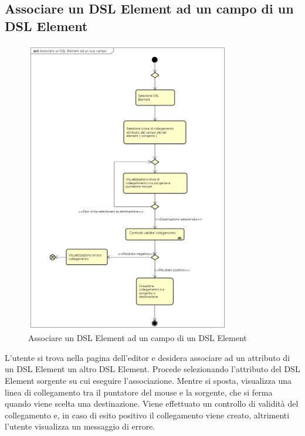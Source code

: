     \subsection{Associare un DSL Element ad un campo di un DSL Element}
    \begin{figure}[H]
      \centering
      \includegraphics[width=0.8\textwidth]{res/img/associazioneDSLElement.png}
      \caption{Associare un DSL Element ad un campo di un DSL Element}
      \label{fig:diagram_model}
    \end{figure}
    L'utente si trova nella pagina dell'editor e desidera associare ad un attributo di un DSL Element un altro DSL Element. Procede selezionando l'attributo del DSL Element sorgente su cui eseguire l'associazione. Mentre si sposta, visualizza una linea di collegamento tra il puntatore del mouse e la sorgente, che si ferma quando viene scelta una destinazione. Viene effettuato un controllo di validità del collegamento e, in caso di esito positivo il collegamento viene creato, altrimenti l'utente visualizza un messaggio di errore.
